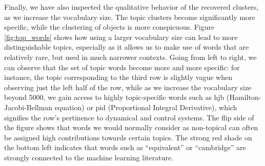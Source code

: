 Finally, we have also inspected the qualitative behavior of the recovered
clusters, as we increase the vocabulary size. The topic clusters become
significantly more specific, while the clustering of objects is more
conspicuous. Figure \ref{fig:top_words} shows how using a larger vocabulary size
can lead to more distinguishable topics, especially as it allows us to make use
of words that are relatively rare, but used in much narrower contexts. Going
from left to right, we can observe that the set of topic words become more and
more specific: for instance, the topic corresponding to the third row is
slightly vague when observing just the left half of the row, while as we
increase the vocabulary size beyond 5000, we gain access to highly
topic-specific words such as hjb (Hamilton-Jacobi-Bellman equation) or pid 
(Proportional Integral Derivative), which signifies the row's pertinence to
dynamical and control systems. The flip side of the figure shows that words we
would normally consider as non-topical can often be assigned high contributions
towards certain topics. The strong red shade on the bottom left indicates that
words such as ``equivalent'' or ``cambridge'' are strongly connected to the
machine learning literature.

